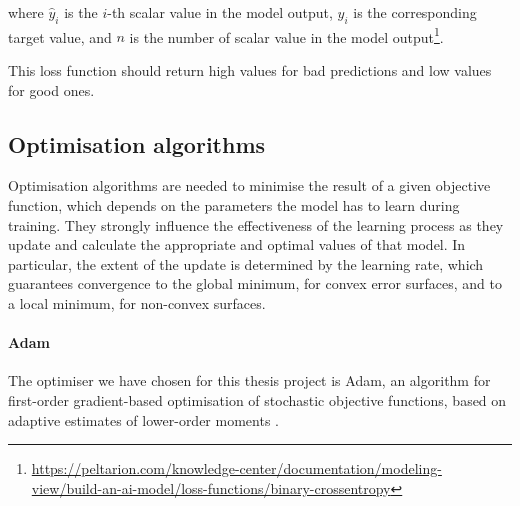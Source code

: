 \noindent
where $\hat y_i$ is the $i$-th scalar value in the model output, $y_i$ is the 
corresponding target value, and $n$ is the number of scalar value in the model 
output\footnote{\url{https://peltarion.com/knowledge-center/documentation/modeling-view/build-an-ai-model/loss-functions/binary-crossentropy}}.

This loss function should return high values for bad predictions and low values for 
good ones.

\subsection{Optimisation algorithms}
\label{subsec:optimiser}
Optimisation algorithms are needed to minimise the result of a given objective 
function, which depends on the parameters the model has to learn during 
training.
They strongly influence the effectiveness of the learning process as they update 
and calculate the appropriate and optimal values of that model. 
In particular, the extent of the update is determined by the learning rate, which 
guarantees convergence to the global minimum, for convex error surfaces, and to 
a local minimum, for non-convex surfaces.

\paragraph*{Adam}

The optimiser we have chosen for this thesis project is Adam, {an algorithm for 
	first-order gradient-based optimisation of stochastic objective functions, based 
	on adaptive estimates of lower-order moments} \cite[][]{kingma2014adam, 
	loshchilov2017decoupled}. 

\fi